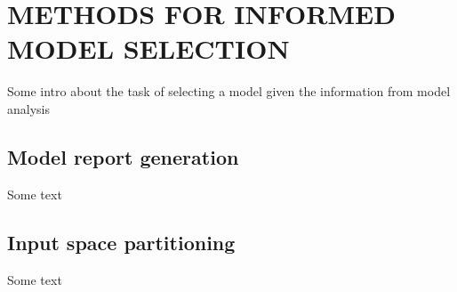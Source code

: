 \chapter{METHODS FOR INFORMED MODEL SELECTION\label{chapter:selection}}

Some intro about the task of selecting a model given the information from model analysis

\section{Model report generation\label{sec:report_gen}}

Some text

\section{Input space partitioning\label{sec:input_partition}}

Some text
